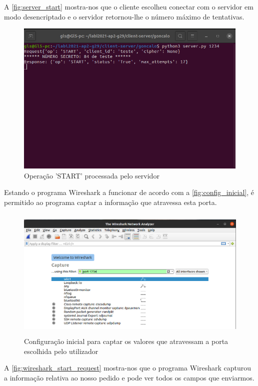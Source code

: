 \documentclass{report}
\begin{document}
A \autoref{fig:server_start} mostra-nos que o cliente escolheu conectar com o servidor em modo desencriptado e o servidor retornou-lhe o número máximo de tentativas.

\begin{figure}[!h]
\center 
\includegraphics[height=210pt]{img/non_encripted/server_start.png}
\caption{Operação 'START' processada pelo servidor}
\label{fig:server_start}
\end{figure}

Estando o programa Wireshark a funcionar de acordo com a \autoref{fig:config_inicial}, é permitido ao programa captar a informação que atravessa esta porta. 

\begin{figure}[!h]
\center 
\includegraphics[height=180pt]{img/non_encripted/config_inicial.png}
\caption{Configuração inicial para captar os valores que atravessam a porta escolhida pelo utilizador}
\label{fig:config_inicial}
\end{figure}

A \autoref{fig:wireshark_start_request} mostra-nos que o programa Wireshark capturou a informação relativa ao nosso pedido e pode ver todos os campos que enviarmos.
\end{document}

